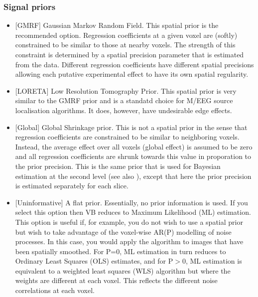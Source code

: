 \documentclass[a4paper,titlepage]{book}
\begin{document}
\subsubsection{Signal priors}
\begin{itemize}

\item{[GMRF] Gaussian Markov Random Field. This spatial prior is the recommended option. Regression coefficients at a given voxel are (softly) constrained to be similar to those at nearby voxels. The strength of this constraint is determined by a spatial precision parameter that is estimated from the data. Different regression coefficients have different spatial precisions allowing each putative experimental effect to have its own spatial regularity. }

                                                                                                            

\item{[LORETA] Low Resolution Tomography Prior. This spatial prior is very similar to the GMRF prior and is a standatd choice for M/EEG source localisation algorithms. It does, however, have undesirable edge effects.}

                                                                                                            

\item{[Global] Global Shrinkage prior. This is not a spatial prior in the sense that regression coefficients are constrained to be similar to neighboring voxels. Instead, the average effect over all voxels (global effect) is assumed to be zero and all regression coefficients are shrunk towards this value in proporation to the prior precision. This is the same prior that is used for Bayesian estimation at the second level 
(see also \cite{karl_posterior}), except that here the prior precision is estimated separately for each slice. }

                                                                                                            

\item{[Uninformative] A flat prior. Essentially, no prior information is used. If you select this option then VB reduces to Maximum Likelihood (ML) estimation. This option is useful if, for example, you do not wish to use a spatial prior but wish to take advantage of the voxel-wise AR(P) modelling of noise processes. In this case, you would apply the algorithm to images that have been spatially smoothed. For P=0, ML estimation in turn reduces to Ordinary Least Squares (OLS) estimates, and for P$>$0, ML estimation is equivalent to a weighted least squares (WLS) algorithm but where the weights are different at each voxel. This reflects the different noise correlations at each voxel. }

\end{itemize}
\end{document}
